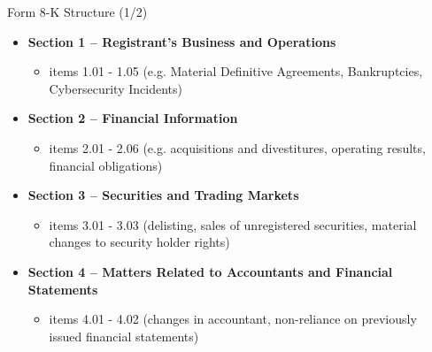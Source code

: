 \documentclass{beamer}
\begin{document}
\begin{frame}{Form 8-K Structure (1/2)}
\begin{itemize}
\item \textbf{Section 1 – Registrant's Business and Operations}
\begin{itemize}
\item items 1.01 - 1.05 (e.g. Material Definitive Agreements, Bankruptcies, Cybersecurity Incidents)
\end{itemize}
\item \textbf{Section 2 – Financial Information}
\begin{itemize}
\item items 2.01 - 2.06 (e.g. acquisitions and divestitures, operating results, financial obligations)
\end{itemize}
\item \textbf{Section 3 – Securities and Trading Markets}
\begin{itemize}
\item items 3.01 - 3.03 (delisting, sales of unregistered securities, material changes to security holder rights)
\end{itemize}
\item \textbf{Section 4 – Matters Related to Accountants and Financial Statements}
\begin{itemize}
\item items 4.01 - 4.02 (changes in accountant, non-reliance on previously issued financial statements)
\end{itemize}
\end{itemize}
\end{frame}
\end{document}
